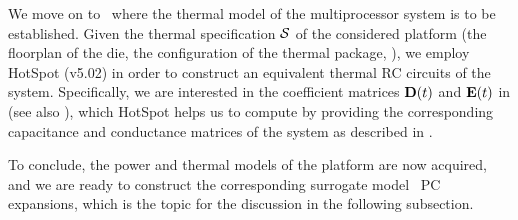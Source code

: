 We move on to \ where the thermal model of the multiprocessor system is to be established.
Given the thermal specification $\mathcal{S}$ of the considered platform (the floorplan of the die, the configuration of the thermal package, \etc), we employ HotSpot (v5.02) \cite{skadron2004} in order to construct an equivalent thermal RC circuits of the system.
Specifically, we are interested in the coefficient matrices $\mCF(\t)$ and $\mCS(\t)$ in  (see also ), which HotSpot helps us to compute by providing the corresponding capacitance and conductance matrices of the system as described in .

To conclude, the power and thermal models of the platform are now acquired, and we are ready to construct the corresponding surrogate model \via\ PC expansions, which is the topic for the discussion in the following subsection.
